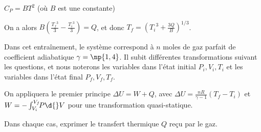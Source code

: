 \begin{enonce}
$C_P=B T^2$ (où $B$ est une constante)
\end{enonce}


\begin{corrige}
On a alors $B \left (\frac{{T_f}^3}{3}-\frac{{T_i}^3}{3}\right)=Q$, et donc $T_f=\left({T_i}^3 + \frac{3Q}{B}\right)^{1/3}$.
\end{corrige}


\finEntrainement



\hauteurLargeurCadreReponse		{8mm}{5cm}
\typeEntrainement				{} %
\initialisationEntrainement

Dans cet entraînement, le système correspond à $n$ moles de gaz parfait de coefficient adiabatique
$\gamma =\np{1,4}$. Il subit différentes transformations suivant les questions, et nous noterons les variables dans l'état initial $P_i, V_i, T_i$ et les variables dans l'état final $P_f, V_f, T_f$.

On appliquera le premier principe $\Delta U = W + Q$, avec $\Delta U =\frac{nR}{\gamma - 1} (T_f - T_i)$ et $W= -\int_{V_i}^{V_f}\!\! P\d{}V$ pour une transformation quasi-statique.

Dans chaque cas, exprimer le transfert thermique $ Q$ reçu par le gaz.
\debutEntrainement


